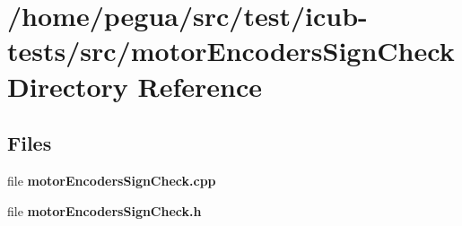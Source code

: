 \section{/home/pegua/src/test/icub-\/tests/src/motor\-Encoders\-Sign\-Check Directory Reference}
\label{dir_7afe760acf634ae748bef9bf87f73d01}
\subsection*{Files}
\begin{DoxyCompactItemize}
\item 
file {\bfseries motor\-Encoders\-Sign\-Check.\-cpp}
\item 
file {\bfseries motor\-Encoders\-Sign\-Check.\-h}
\end{DoxyCompactItemize}
